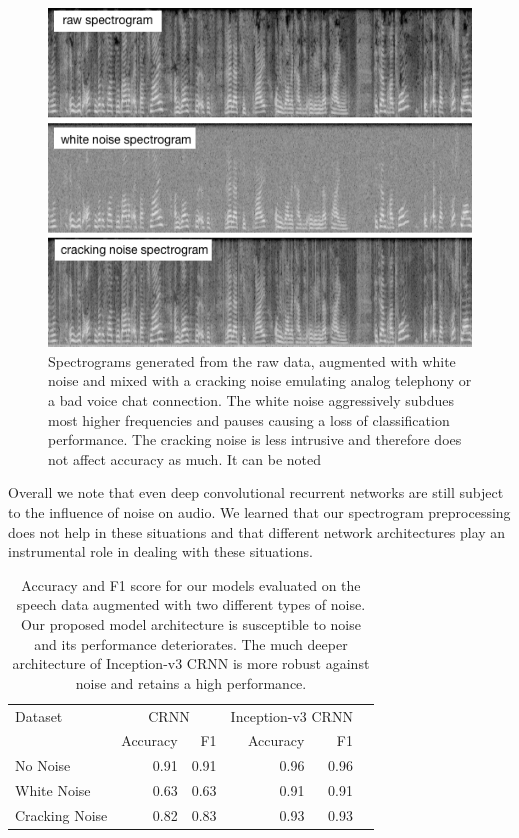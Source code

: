 	\begin{figure}[]
  		\centering
    	\includegraphics[width=\textwidth, keepaspectratio]{img/noise_spectrograms.png}
    	\caption{Spectrograms generated from the raw data, augmented with white noise and mixed with a cracking noise emulating analog telephony or a bad voice chat connection. The white noise aggressively subdues most higher frequencies and pauses causing a loss of classification performance. The cracking noise is less intrusive and therefore does not affect accuracy as much. It can be noted }
    	\label{fig:noise}
	\end{figure}


Overall we note that even deep convolutional recurrent networks are still subject to the influence of noise on audio. We learned that our spectrogram preprocessing does not help in these situations and that different network architectures play an instrumental role in dealing with these situations.
 
	\begin{table}[]
	\centering
	\begin{tabularx}{\textwidth}{lrrrrr}
	\toprule
	Dataset & \multicolumn{2}{c}{CRNN} & \multicolumn{2}{c}{Inception-v3 CRNN} \\  
                & Accuracy  & F1    & Accuracy  & F1   \\ \midrule
No Noise		& 0.91		& 0.91	& 0.96		& 0.96 \\                
White Noise     & 0.63      & 0.63  & 0.91      & 0.91 \\
Cracking Noise  & 0.82      & 0.83  & 0.93      & 0.93 \\
 	\bottomrule
	\end{tabularx}
	\caption{Accuracy and F1 score for our models evaluated on the speech data augmented with two different types of noise. Our proposed model architecture is susceptible to noise and its performance deteriorates. The much deeper architecture of Inception-v3 CRNN is more robust against noise and retains a high performance.}
	\label{tab:noise}
	\end{table}



